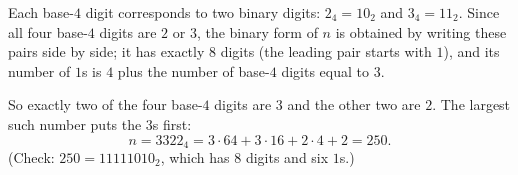 Each base-$4$ digit corresponds to two binary digits: $2_4=10_2$ and $3_4=11_2$. Since all four base-$4$ digits are $2$ or $3$, the binary form of $n$ is obtained by writing these pairs side by side; it has exactly $8$ digits (the leading pair starts with $1$), and its number of $1$s is $4$ plus the number of base-$4$ digits equal to $3$.

So exactly two of the four base-$4$ digits are $3$ and the other two are $2$. The largest such number puts the $3$s first:
\[
n=3322_4=3\cdot64+3\cdot16+2\cdot4+2=\boxed{250}.
\]
(Check: $250=11111010_2$, which has $8$ digits and six $1$s.)
